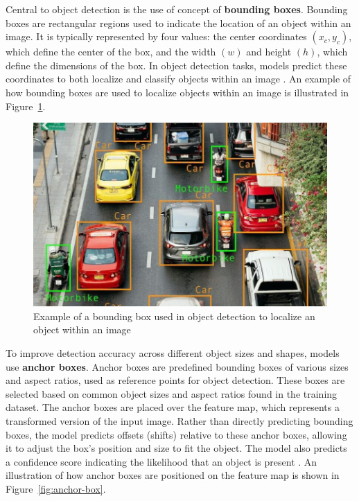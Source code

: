 Central to object detection is the use of concept of \textbf{bounding boxes}. Bounding boxes are rectangular regions used to indicate the location of an object within an image. It is typically represented by four values: the center coordinates \((x_c, y_c)\), which define the center of the box, and the width \((w)\) and height \((h)\), which define the dimensions of the box. In object detection tasks, models predict these coordinates to both localize and classify objects within an image \cite{peopleforai:boundingbox}. An example of how bounding boxes are used to localize objects within an image is illustrated in Figure~\ref{fig:boundingbox}.

\begin{figure}[h!]
    \centering
    \includegraphics[width=0.75\linewidth]{figures/theory/image-recognition/bbox-example.png}
    \caption[Bounding box in object detection]{Example of a bounding box used in object detection to localize an object within an image}
    \label{fig:boundingbox}
\end{figure}

To improve detection accuracy across different object sizes and shapes, models use \textbf{anchor boxes}. Anchor boxes are predefined bounding boxes of various sizes and aspect ratios, used as reference points for object detection. These boxes are selected based on common object sizes and aspect ratios found in the training dataset. The anchor boxes are placed over the feature map, which represents a transformed version of the input image. Rather than directly predicting bounding boxes, the model predicts offsets (shifts) relative to these anchor boxes, allowing it to adjust the box's position and size to fit the object. The model also predicts a confidence score indicating the likelihood that an object is present \cite{thinkautonomous:anchorboxes}. An illustration of how anchor boxes are positioned on the feature map is shown in Figure~\ref{fig:anchor-box}.

